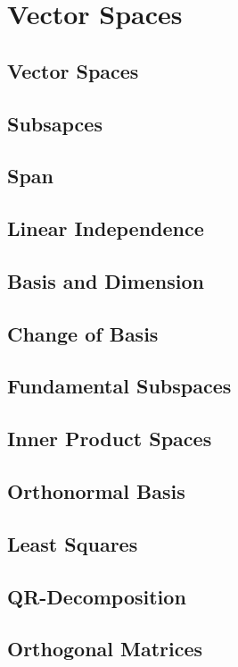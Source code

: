 \documentclass[../satmath.tex]{subfiles}
\begin{document}
\chapter{Vector Spaces}
\section{Vector Spaces}
\section{Subsapces}
\section{Span}
\section{Linear Independence}
\section{Basis and Dimension}
\section{Change of Basis}
\section{Fundamental Subspaces}
\section{Inner Product Spaces}
\section{Orthonormal Basis}
\section{Least Squares}
\section{QR-Decomposition}
\section{Orthogonal Matrices}
\end{document}
